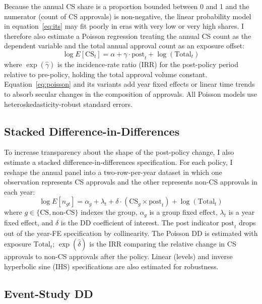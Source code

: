 Because the annual CS share is a proportion bounded between 0 and 1 and the numerator (count of CS approvals) is non-negative, the linear probability model in equation~\eqref{eq:its} may fit poorly in eras with very low or very high shares. I therefore also estimate a Poisson regression treating the annual CS count as the dependent variable and the total annual approval count as an exposure offset:
\begin{equation}
\label{eq:poisson}
\log E[\text{CS}_t] = \alpha + \gamma \cdot \text{post}_t + \log(\text{Total}_t)
\end{equation}
where $\exp(\hat{\gamma})$ is the incidence-rate ratio (IRR) for the post-policy period relative to pre-policy, holding the total approval volume constant. Equation~\eqref{eq:poisson} and its variants add year fixed effects or linear time trends to absorb secular changes in the composition of approvals. All Poisson models use heteroskedasticity-robust standard errors.

\subsection{Stacked Difference-in-Differences}

To increase transparency about the shape of the post-policy change, I also estimate a stacked difference-in-differences specification. For each policy, I reshape the annual panel into a two-row-per-year dataset in which one observation represents CS approvals and the other represents non-CS approvals in each year:
\begin{equation}
\label{eq:dd}
\log E[n_{gt}] = \alpha_g + \lambda_t + \delta \cdot (\text{CS}_g \times \text{post}_t) + \log(\text{Total}_t)
\end{equation}
where $g \in \{\text{CS}, \text{non-CS}\}$ indexes the group, $\alpha_g$ is a group fixed effect, $\lambda_t$ is a year fixed effect, and $\delta$ is the DD coefficient of interest. The post indicator $\text{post}_t$ drops out of the year-FE specification by collinearity. The Poisson DD is estimated with exposure $\text{Total}_t$; $\exp(\hat{\delta})$ is the IRR comparing the relative change in CS approvals to non-CS approvals after the policy. Linear (levels) and inverse hyperbolic sine (IHS) specifications are also estimated for robustness.

\subsection{Event-Study DD}

